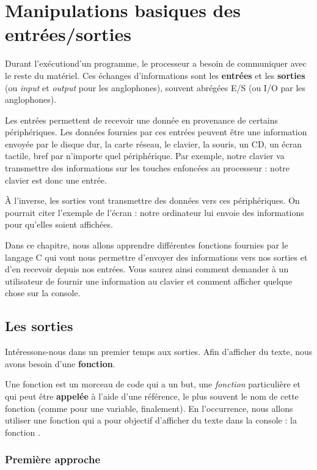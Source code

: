 \chapter{Manipulations basiques des entrées/sorties}

Durant l'exécutiond'un programme, le processeur a besoin de communiquer 
avec le reste du matériel. Ces échanges d'informations sont les \textbf{entrées} et les
\textbf{sorties} (ou \emph{input} et \emph{output} pour les
anglophones), souvent abrégées E/S (ou I/O par les anglophones).

Les entrées permettent de recevoir une donnée en provenance de certains
périphériques. Les données fournies par ces entrées peuvent être une
information envoyée par le disque dur, la carte réseau, le clavier, la
souris, un CD, un écran tactile, bref par n'importe quel périphérique.
Par exemple, notre clavier va transmettre des informations sur les
touches enfoncées au processeur : notre clavier est donc une entrée.

À l'inverse, les sorties vont transmettre des données vers ces
périphériques. On pourrait citer l'exemple de l'écran : notre ordinateur
lui envoie des informations pour qu'elles soient affichées.

Dans ce chapitre, nous allons apprendre différentes fonctions fournies
par le langage C qui vont nous permettre d'envoyer des informations vers
nos sorties et d'en recevoir depuis nos entrées. Vous saurez ainsi
comment demander à un utilisateur de fournir une information au clavier
et comment afficher quelque chose sur la console.

\section{Les sorties}

Intéressons-nous dans un premier temps aux sorties. Afin
d'afficher du texte, nous avons besoin d'une \textbf{fonction}.

Une fonction est un morceau de code qui a un but, une \emph{fonction}
particulière et qui peut être \textbf{appelée} à l'aide d'une référence,
le plus souvent le nom de cette fonction (comme pour une variable,
finalement). En l'occurrence, nous allons utiliser une fonction qui a
pour objectif d'afficher du texte dans la console : la fonction
.

\subsection{Première approche}
\label{premiere-approche}

